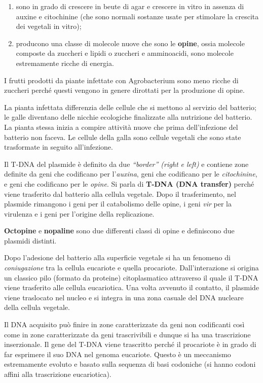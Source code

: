 \documentclass[]{article}
\begin{document}
\begin{enumerate}
\def\labelenumi{\arabic{enumi}.}
\itemsep1pt\parskip0pt
\item
  sono in grado di crescere in beute di agar e crescere in vitro in
  assenza di auxine e citochinine (che sono normali sostanze usate per
  stimolare la crescita dei vegetali in vitro);
\item
  producono una classe di molecole nuove che sono le \textbf{opine},
  ossia molecole composte da zuccheri e lipidi o zuccheri e amminoacidi,
  sono molecole estremamente ricche di energia.
\end{enumerate}

I frutti prodotti da piante infettate con Agrobacterium sono meno ricche
di zuccheri perché questi vengono in genere dirottati per la produzione
di opine.

La pianta infettata differenzia delle cellule che si mettono al servizio
del batterio; le galle diventano delle nicchie ecologiche finalizzate
alla nutrizione del batterio. La pianta stessa inizia a compire attività
nuove che prima dell'infezione del batterio non faceva. Le cellule della
galla sono cellule vegetali che sono state trasformate in seguito
all'infezione.

Il T-DNA del plasmide è definito da due \emph{``border'' (right e left)}
e contiene zone definite da geni che codificano per l'\emph{auxina},
geni che codificano per le \emph{citochinine}, e geni che codificano per
le \emph{opine}. Si parla di \textbf{T-DNA (DNA transfer)} perché viene
trasferito dal batterio alla cellula vegetale. Dopo il trasferimento,
nel plasmide rimangono i geni per il catabolismo delle opine, i geni
\emph{vir} per la virulenza e i geni per l'origine della replicazione.

\textbf{Octopine} e \textbf{nopaline} sono due differenti classi di
opine e definiscono due plasmidi distinti.

Dopo l'adesione del batterio alla superficie vegetale si ha un fenomeno
di \emph{coniugazione} tra la cellula eucariote e quella procariote.
Dall'interazione si origina un classico pilo (formato da proteine)
citoplasmatico attraverso il quale il T-DNA viene trasferito alle
cellula eucariotica. Una volta avvenuto il contatto, il plasmide viene
traslocato nel nucleo e si integra in una zona casuale del DNA nucleare
della cellula vegetale.

Il DNA acquisito può finire in zone caratterizzate da geni non
codificanti così come in zone caratterizzate da geni trascrivibili e
dunque si ha una trascrizione inserzionale. Il gene del T-DNA viene
trascritto perché il procariote è in grado di far esprimere il suo DNA
nel genoma eucariote. Questo è un meccanismo estremamente evoluto e
basato sulla sequenza di basi codoniche (si hanno codoni affini alla
trascrizione eucariotica).
\end{document}
